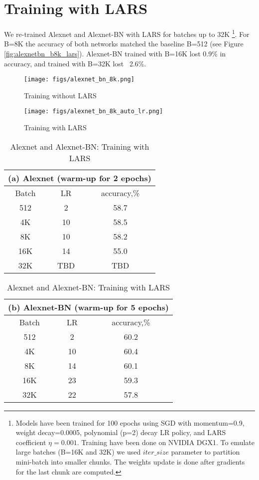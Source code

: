 \documentclass{article} %
\begin{document}
\section{Training with LARS}
We re-trained Alexnet and Alexnet-BN with LARS for batches up to 32K 
\footnote{ Models have been trained for 100 epochs using SGD with momentum=0.9, weight decay=0.0005, polynomial (p=2) decay LR policy, and LARS coefficient $\eta=0.001$. Training have been done on NVIDIA DGX1. 
To emulate large batches (B=16K and 32K) we used $iter\_size$ parameter to partition mini-batch into smaller chunks. The weights update is done after gradients for the last chunk are computed.
}. 
For B=8K  the accuracy of both networks matched the baseline B=512 (see Figure \ref{fig:alexnetbn_b8k_lars}). Alexnet-BN trained with B=16K lost 0.9\% in accuracy, and trained with B=32K lost ~2.6\%.
\begin{figure*}[htb!]
    \begin{subfigure}[b]{0.55\textwidth}
        \centering
        \texttt{[image: figs/alexnet\_bn\_8k.png]}
        \caption{Training without LARS}
    \end{subfigure}
    \begin{subfigure}[b]{0.55\textwidth}
        \centering
        \texttt{[image: figs/alexnet\_bn\_8k\_auto\_lr.png]}
        \caption{Training with LARS}
    \end{subfigure}
    \caption{\label{fig:alexnetbn_b8k_lars} LARS: Alexnet-BN with B=8K}
\end{figure*}
\begin{table}[htb!]
  \caption{Alexnet and Alexnet-BN: Training with LARS}
  \label{tab:alexnet_lars}
  \centering
  {\renewcommand{\arraystretch}{1.2}
  \begin{tabular}[t]{|c|c|c|}
  \multicolumn{3}{c}{(a) Alexnet (warm-up for 2 epochs)} \\[5px]
  \hline Batch & LR  & accuracy,\% \\
  \hline  512  & 2   &  58.7 \\
  \hline  4K   & 10  &  58.5 \\
  \hline  8K   & 10  &  58.2 \\
  \hline 16K   & 14  &  55.0 \\
  \hline 32K   & TBD &  TBD \\
  \hline
  \end{tabular}}
  \quad
  {\renewcommand{\arraystretch}{1.2}
  \begin{tabular}[t]{|c|c|c|}
  \multicolumn{3}{c}{(b) Alexnet-BN (warm-up for 5 epochs)} \\[5px]
  \hline Batch & LR & accuracy,\% \\
  \hline  512  & 2  & 60.2 \\
  \hline  4K   & 10 & 60.4 \\
  \hline  8K   & 14 & 60.1 \\
  \hline 16K   & 23 & 59.3 \\
  \hline 32K   & 22 & 57.8 \\
  \hline
  \end{tabular}}
\end{table}
\end{document}
